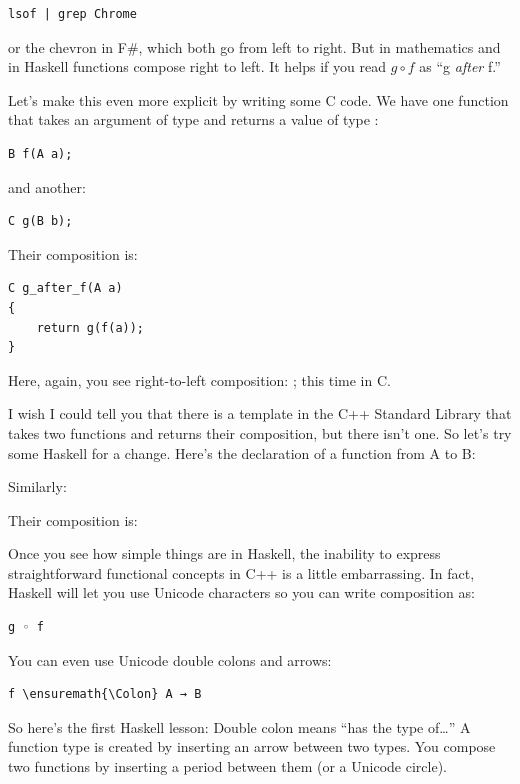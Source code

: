 \begin{Verbatim}
lsof | grep Chrome
\end{Verbatim}
or the chevron \code{>>} in F\#, which both
go from left to right. But in mathematics and in Haskell functions
compose right to left. It helps if you read $g \circ f$ as ``g \emph{after} f.''

Let's make this even more explicit by writing some C code. We have one
function  that takes an argument of type  and
returns a value of type :

\begin{Verbatim}
B f(A a);
\end{Verbatim}
and another:

\begin{Verbatim}
C g(B b);
\end{Verbatim}
Their composition is:

\begin{Verbatim}
C g_after_f(A a)
{
    return g(f(a));
}
\end{Verbatim}
Here, again, you see right-to-left composition: ; this
time in C.

I wish I could tell you that there is a template in the C++ Standard
Library that takes two functions and returns their composition, but
there isn't one. So let's try some Haskell for a change. Here's the
declaration of a function from A to B:

Similarly:

Their composition is:

Once you see how simple things are in Haskell, the inability to express
straightforward functional concepts in C++ is a little embarrassing. In
fact, Haskell will let you use Unicode characters so you can write
composition as:
\begin{Verbatim}
g ◦ f
\end{Verbatim}
You can even use Unicode double colons and arrows:
\begin{Verbatim}[commandchars=\\\{\}]
f \ensuremath{\Colon} A → B
\end{Verbatim}
So here's the first Haskell lesson: Double colon means ``has the type
of\ldots{}'' A function type is created by inserting an arrow between
two types. You compose two functions by inserting a period between them
(or a Unicode circle).

